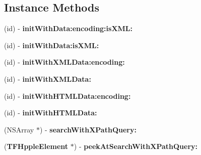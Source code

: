\subsection*{Instance Methods}
\begin{DoxyCompactItemize}
\item 
(id) -\/ {\bfseries init\+With\+Data\+:encoding\+:is\+X\+M\+L\+:}\label{interface_t_f_hpple_add58ba26927ae61693fd386325d8f7bb}

\item 
(id) -\/ {\bfseries init\+With\+Data\+:is\+X\+M\+L\+:}\label{interface_t_f_hpple_a08f93216c93c656d10f855d0e827bedc}

\item 
(id) -\/ {\bfseries init\+With\+X\+M\+L\+Data\+:encoding\+:}\label{interface_t_f_hpple_a9c736b797fdbbd6b6cd9d0eac9c8115c}

\item 
(id) -\/ {\bfseries init\+With\+X\+M\+L\+Data\+:}\label{interface_t_f_hpple_afa3c56c793ee65d94ae60de9162cb375}

\item 
(id) -\/ {\bfseries init\+With\+H\+T\+M\+L\+Data\+:encoding\+:}\label{interface_t_f_hpple_a8cb76c8346dde116aeebd11080192368}

\item 
(id) -\/ {\bfseries init\+With\+H\+T\+M\+L\+Data\+:}\label{interface_t_f_hpple_a8fecd7b10c51c897d572885daca0b15c}

\item 
(N\+S\+Array $\ast$) -\/ {\bfseries search\+With\+X\+Path\+Query\+:}\label{interface_t_f_hpple_a5c912f232c2f3b9ef5cf164227ce1016}

\item 
({\bf T\+F\+Hpple\+Element} $\ast$) -\/ {\bfseries peek\+At\+Search\+With\+X\+Path\+Query\+:}\label{interface_t_f_hpple_abe341e921def7fa82a96ed265ce2fd4e}

\end{DoxyCompactItemize}
